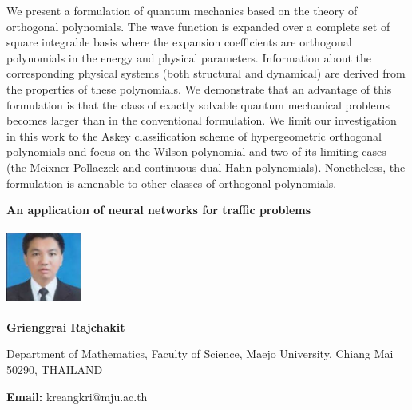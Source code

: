 \documentclass[twoside,11pt]{amsart}
\begin{document}
\vskip 5mm
We present a formulation of quantum mechanics based on the theory of orthogonal polynomials. The wave function is expanded over a complete set of square integrable basis where the expansion coefficients are orthogonal polynomials in the energy and physical parameters. Information about the corresponding physical systems (both structural and dynamical) are derived from the properties of these polynomials. We demonstrate that an advantage of this formulation is that the class of exactly solvable quantum mechanical problems becomes larger than in the conventional formulation. We limit our investigation in this work to the Askey classification scheme of hypergeometric orthogonal polynomials and focus on the Wilson polynomial and two of its limiting cases (the Meixner-Pollaczek and continuous dual Hahn polynomials). Nonetheless, the formulation is amenable to other classes of orthogonal polynomials.
\vskip 5mm
\newpage
\vskip 10mm
\begin{center}\bf\LARGE
An application of neural networks for traffic problems
\end{center}
\vskip 5mm
\begin{center}
\includegraphics[width=2.5cm, height=2.5cm, keepaspectratio=false]{GR3.jpg}
\end{center}
\vskip 2mm

\centerline{\textbf{ Grienggrai Rajchakit }}
\vskip 2mm
\begin{flushleft}
Department of Mathematics, Faculty of Science, Maejo University, Chiang Mai 50290, THAILAND
\end{flushleft}
\vskip 2mm
\begin{flushleft}
{\bf Email:} kreangkri@mju.ac.th
\end{flushleft}
\end{document}
